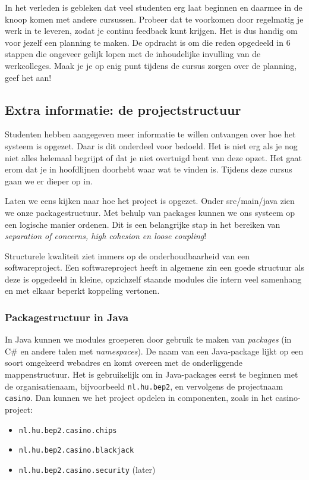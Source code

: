 In het verleden is gebleken dat veel studenten erg laat beginnen 
en daarmee in de knoop komen met andere cursussen. Probeer dat te 
voorkomen door regelmatig je werk in te leveren, zodat je continu feedback 
kunt krijgen. Het is dus handig om voor jezelf een planning te maken.
De opdracht is om die reden opgedeeld in 6 stappen die ongeveer gelijk lopen 
met de inhoudelijke invulling van de werkcolleges.
Maak je je op enig punt tijdens de cursus zorgen over de planning,
geef het aan!

\subsection{Extra informatie: de projectstructuur}
Studenten hebben aangegeven meer informatie te willen ontvangen over hoe het 
systeem is opgezet. Daar is dit onderdeel voor bedoeld. Het is niet 
erg als je nog niet alles helemaal begrijpt of dat je niet overtuigd 
bent van deze opzet. Het gaat erom dat je in hoofdlijnen doorhebt 
waar wat te vinden is. Tijdens deze cursus gaan we er dieper op in.

Laten we eens kijken naar hoe het project is opgezet.
Onder src/main/java zien we onze packagestructuur.
Met behulp van packages kunnen we ons systeem op een logische manier 
ordenen. Dit is een belangrijke stap in het bereiken van 
\textit{separation of concerns, high cohesion en loose coupling}!

Structurele kwaliteit ziet immers op de onderhoudbaarheid
van een softwareproject. Een softwareproject heeft in algemene zin 
een goede structuur als deze is opgedeeld in kleine,
opzichzelf staande modules die intern veel samenhang 
en met elkaar beperkt koppeling vertonen.

\subsubsection{Packagestructuur in Java}
In Java kunnen we modules groeperen door gebruik te maken van 
\emph{packages} (in C\# en andere talen met \emph{namespaces}).
De naam van een Java-package lijkt op een soort omgekeerd webadres
en komt overeen met de onderliggende mappenstructuur.
Het is gebruikelijk om in Java-packages eerst te beginnen met de organisatienaam,
bijvoorbeeld \texttt{nl.hu.bep2}, en vervolgens de projectnaam \texttt{casino}.
Dan kunnen we het project opdelen in componenten, zoals in het casino-project: 
\begin{itemize}
\item \texttt{nl.hu.bep2.casino.chips}
\item \texttt{nl.hu.bep2.casino.blackjack}
\item \texttt{nl.hu.bep2.casino.security} (later)
\end{itemize}

